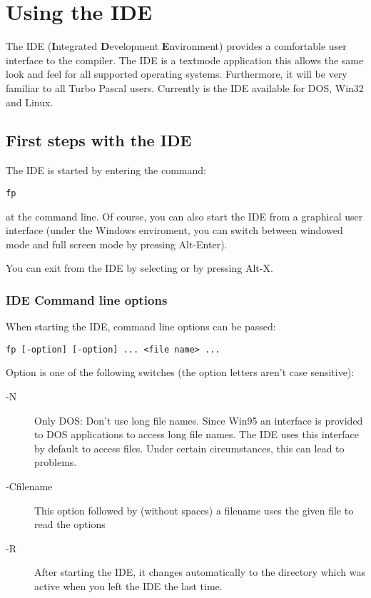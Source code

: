 \chapter{Using the IDE}

The IDE (\textbf{I}ntegrated \textbf{D}evelopment \textbf{E}nvironment) 
provides a comfortable user interface to the compiler. The IDE is a textmode
application this allows the same look and feel for all supported
operating systems. Furthermore, it will be very familiar to all
Turbo Pascal users.
Currently is the IDE available for DOS, Win32 and Linux.

\section{First steps with the IDE}

The IDE is started by entering the command:
\begin{verbatim}
fp
\end{verbatim}
at the command line. Of course, you can also start the IDE
from a graphical user interface (under the Windows enviroment, you
can switch between windowed mode and full screen mode by pressing
Alt-Enter).

You can exit from the IDE by selecting  or by pressing
Alt-X.

\subsection{IDE Command line options}

When starting the IDE, command line options can be passed:
\begin{verbatim}
fp [-option] [-option] ... <file name> ...
\end{verbatim}

Option is one of the following switches (the option letters
aren't case sensitive):

\begin{description}
\item [-N] Only DOS: Don't use long file names. Since Win95 an interface
is provided to DOS applications to access long file names. The IDE uses
this interface by default to access files. Under certain circumstances, this
can lead to problems.
\item [-Cfilename] This option followed by (without spaces)
a filename uses the given file to read the options
\item [-R] After starting the IDE, it changes automatically to the directory
which was active when you left the IDE the last time.
\end{description}

